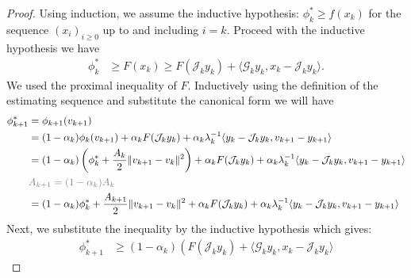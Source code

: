 \documentclass[12pt]{article}
\begin{document}
        \begin{proof}   
            Using induction, we assume the inductive hypothesis: $\phi_k^* \ge f(x_k)$ for the sequence $(x_i)_{i \ge 0}$ up to and including $i = k$.
            Proceed with the inductive hypothesis we have 
            \begin{align*}
                \phi_k^* 
                &\ge F(x_k)
                \ge F(\mathcal J_k y_k) + \langle \mathcal G_k y_k, x_k - \mathcal J_k y_k\rangle. 
            \end{align*}
            We used the proximal inequality of $F$. 
            Inductively using the definition of the estimating sequence and substitute the canonical form we will have 
            \begin{align*}
                \phi_{k + 1}^*
                &= \phi_{k + 1}(v_{k + 1})
                \\
                &= 
                (1 - \alpha_k) \phi_k(v_{k + 1})
                + \alpha_kF(\mathcal J_k y_k)
                + \alpha_k\lambda_k^{-1}\langle 
                    y_k - \mathcal J_k y_k, v_{k + 1} - y_{k + 1}
                \rangle
                \\
                &= 
                \left(
                    1 - \alpha_k
                \right)\left(
                    \phi_k^* + \frac{A_k}{2}\Vert v_{k + 1} - v_k\Vert^2
                \right)
                + 
                \alpha_k F(\mathcal J_k y_k) 
                + 
                \alpha_k\lambda_k^{-1}\langle 
                    y_k - \mathcal J_k y_k, v_{k + 1} - y_{k + 1}
                \rangle
                \\
                & \textcolor{gray}{
                    A_{k + 1} = (1 - \alpha_k)A_k
                }
                \\
                &=
                (1 - \alpha_k)\phi_k^*
                + 
                \frac{A_{k + 1}}{2}\Vert v_{k + 1} - v_k\Vert^2
                + \alpha_k F(\mathcal J_k y_k)
                + \alpha_k\lambda_k^{-1}\langle 
                    y_k - \mathcal J_k y_k, v_{k + 1} - y_{k + 1}
                \rangle
            \end{align*}
            Next, we substitute the inequality by the inductive hypothesis which gives: 
            {\small
            \begin{align*}
                \phi_{k + 1}^*
                &\ge 
                (1 - \alpha_k)
                \left(
                    F(\mathcal J_k y_k) + \langle \mathcal G_k y_k, x_k - \mathcal J_k y_k\rangle

\end{align*}}
\end{proof}
\end{document}
